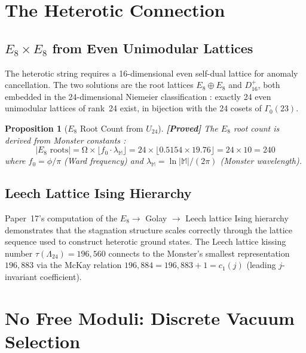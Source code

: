 \documentclass[12pt,a4paper]{article}
\newcommand{\proved}[1]{\textcolor{proved}{\textbf{[Proved]}} #1}
\newtheorem{proposition}[theorem]{Proposition}
\theoremstyle{definition}\newtheorem{definition}[theorem]{Definition}
\theoremstyle{remark}\newtheorem{remark}[theorem]{Remark}
\renewcommand{\O}{\mathrm{\Omega}}
\newcommand{\Monster}{\mathbb{M}}
\newcommand{\Leech}{\Lambda_{24}}
\begin{document}
\section{The Heterotic Connection}
\label{sec:heterotic}

\subsection{$E_8 \times E_8$ from Even Unimodular Lattices}

The heterotic string \cite{ghmr1985} requires a 16-dimensional even
self-dual lattice for anomaly cancellation. The two solutions are the root
lattices $E_8 \oplus E_8$ and $D_{16}^+$, both embedded in the 24-dimensional
Niemeier classification \cite{niemeier1973}: exactly 24 even unimodular
lattices of rank~24 exist, in bijection with the 24 cosets of $\Gamma_0(23)$.

\begin{proposition}[$E_8$ Root Count from $U_{24}$]
\label{prop:e8}
\proved{The $E_8$ root count is derived from Monster constants \cite{paper3}:}
\begin{equation}
  |E_8 \text{ roots}| = \O \times \lfloor f_0 \cdot \lambda_\Monster \rfloor
  = 24 \times \lfloor 0.5154 \times 19.76 \rfloor = 24 \times 10 = 240
\end{equation}
where $f_0 = \phi/\pi$ (Ward frequency) and
$\lambda_\Monster = \ln|\Monster|/(2\pi)$ (Monster wavelength).
\end{proposition}

\subsection{Leech Lattice Ising Hierarchy}

Paper~17's computation of the $E_8 \to$ Golay $\to$ Leech lattice Ising
hierarchy demonstrates that the stagnation structure scales correctly through
the lattice sequence used to construct heterotic ground states. The Leech
lattice kissing number $\tau(\Leech) = 196{,}560$ connects to the Monster's
smallest representation $196{,}883$ via the McKay relation
$196{,}884 = 196{,}883 + 1 = c_1(j)$ (leading $j$-invariant coefficient).

\section{No Free Moduli: Discrete Vacuum Selection}
\label{sec:landscape}
\end{document}
